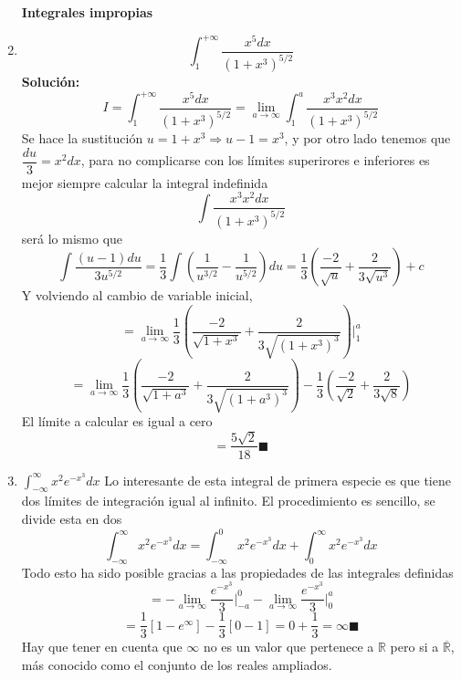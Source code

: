 \documentclass[10pt,twoside]{SelfArx} %
\begin{document}
\begin{enumerate}
\textbf{Integrales impropias}\\
\item 
\begin{equation}
\int_{1}^{+\infty}\dfrac{x^{5}dx}{(1+x^{3})^{5/2}}
\end{equation}
\textbf{Solución:}\\
\begin{equation}
I=\int_{1}^{+\infty}\dfrac{x^{5}dx}{(1+x^{3})^{5/2}}=\lim\limits_{a\rightarrow\infty}\int_{1}^{a}\dfrac{x^{3}x^{2}dx}{(1+x^{3})^{5/2}}
\end{equation}
Se hace la sustitución $ u=1+x^{3}\Rightarrow u-1=x^{3} $, y por otro lado tenemos que $ \dfrac{du}{3}=x^{2}dx $, para no complicarse con los límites superirores e inferiores es mejor siempre calcular la integral indefinida
\[ \int\dfrac{x^{3}x^{2}dx}{(1+x^{3})^{5/2}} \]
será lo mismo que 
\[ \int \dfrac{(u-1)du}{3u^{5/2}}=\dfrac{1}{3}\int\left (\dfrac{1}{u^{3/2}}-\dfrac{1}{u^{5/2}}\right )du=\dfrac{1}{3}\left (\dfrac{-2}{\sqrt{u}}+\dfrac{2}{3\sqrt{u^{3}}}\right )+c \]
Y volviendo al cambio de variable inicial, 
\begin{equation}
=\lim\limits_{a\rightarrow\infty}\dfrac{1}{3}\left (\dfrac{-2}{\sqrt{1+x^{3}}}+\dfrac{2}{3\sqrt{(1+x^{3})^{3}}}\right )\bigg|_{1}^{a}
\end{equation}
\begin{equation}
=\lim\limits_{a\rightarrow\infty}\dfrac{1}{3}\left (\dfrac{-2}{\sqrt{1+a^{3}}}+\dfrac{2}{3\sqrt{(1+a^{3})^{3}}}\right )
-\dfrac{1}{3}\left (\dfrac{-2}{\sqrt{2}}+\dfrac{2}{3\sqrt{8}}\right )
\end{equation}
El límite a calcular es igual a cero
\begin{equation}
=\dfrac{5\sqrt{2}}{18}\blacksquare
\end{equation}
\item $ \displaystyle\int_{-\infty}^{\infty}x^{2}e^{-x^{3}}dx $
Lo interesante de esta integral de primera especie es que tiene dos límites de integración igual al infinito. El procedimiento es sencillo, se divide esta en dos
\begin{equation}
\displaystyle\int_{-\infty}^{\infty}x^{2}e^{-x^{3}}dx=\displaystyle\int_{-\infty}^{0}x^{2}e^{-x^{3}}dx+\displaystyle\int_{0}^{\infty}x^{2}e^{-x^{3}}dx
\end{equation}
Todo esto ha sido posible gracias a las propiedades de las integrales definidas
\begin{equation}
=-\lim\limits_{a\rightarrow\infty}\dfrac{e^{-x^{3}}}{3}\bigg|_{-a}^{0}-\lim\limits_{a\rightarrow\infty}\dfrac{e^{-x^{3}}}{3}\bigg|_{0}^{a}
\end{equation}
\begin{equation}
=\dfrac{1}{3}[1-e^{\infty}]-\dfrac{1}{3}[0-1]=0+\dfrac{1}{3}=\infty\blacksquare
\end{equation}
Hay que tener en cuenta que $ \infty $ no es un valor que pertenece a $ \mathbb{R} $ pero si a $ \overline{\mathbb{R}} $, m\'as conocido como el conjunto de los reales ampliados.


\end{enumerate}
\end{document}
